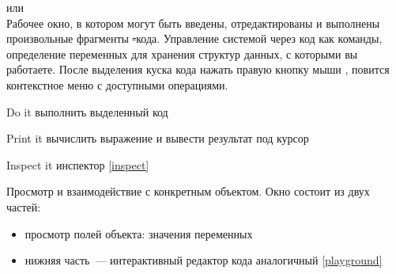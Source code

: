 \secdown



\clearpage
{}\label{playground}


\medskip
\noindent{} или \\
Рабочее окно, в котором могут быть введены, отредактированы и выполнены произвольные фрагменты \st-кода.
Управление системой через код как команды, определение переменных для хранения структур данных, с которыми вы работаете.
После выделения куска кода нажать правую кнопку мыши \keys{\rms}, повится контекстное меню с доступными операциями.

\medskip\noindent



\begin{description}
    \item{Do it}  выполнить выделенный код
    \item{Print it}  вычислить выражение и вывести результат под курсор
    \item{Inspect it}  инспектор \ref{inspect}
\end{description}

\label{inspect}


Просмотр и взаимодействие с конкретным объектом. Окно состоит из двух частей:
\begin{itemize}
    \item просмотр полей объекта: значения переменных
    \item нижняя часть\ --- интерактивный редактор кода аналогичный \ref{playground}
\end{itemize}








\secup
